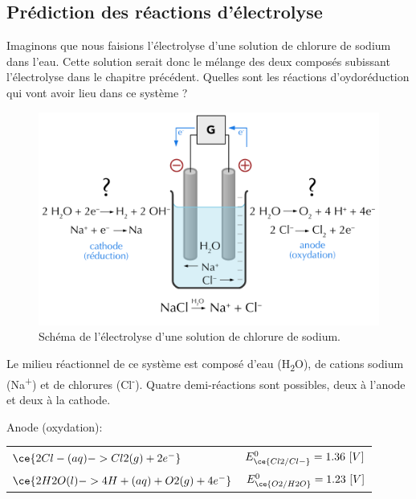 \documentclass[
  11pt,
  a4paper,
  openany]{book}
\begin{document}
\hypertarget{pruxe9diction-des-ruxe9actions-duxe9lectrolyse}{%
\subsection{Prédiction des réactions d'électrolyse}\label{pruxe9diction-des-ruxe9actions-duxe9lectrolyse}}

Imaginons que nous faisions l'électrolyse d'une solution de chlorure de sodium dans l'eau. Cette solution serait donc le mélange des deux composés subissant l'électrolyse dans le chapitre précédent. Quelles sont les réactions d'oydoréduction qui vont avoir lieu dans ce système ?

\begin{figure}

{\centering \includegraphics[width=0.65\linewidth]{images/electrolysis-NaCl-sol} 

}

\caption{Schéma de l'électrolyse d'une solution de chlorure de sodium.}\label{fig:electrolysis-water-NaCl-sol}
\end{figure}

Le milieu réactionnel de ce système est composé d'eau (H\textsubscript{2}O), de cations sodium (Na\textsuperscript{+}) et de chlorures (Cl\textsuperscript{-}). Quatre demi-réactions sont possibles, deux à l'anode et deux à la cathode.

Anode (oxydation):

\begin{longtable}[]{@{}
  >{\centering\arraybackslash}p{}
  >{\raggedright\arraybackslash}p{}@{}}
\toprule()
\endhead
\(\ce{2Cl-(aq) -> Cl2(g) + 2 e^-}\) & \(E^0_{\ce{Cl2/Cl-}} = 1.36\ [V]\) \\
\(\ce{2H2O(l) -> 4H+(aq) + O2(g) + 4 e^-}\) & \(E^0_{\ce{O2/H2O}} = 1.23\ [V]\) \\
\bottomrule()
\end{longtable}
\end{document}
